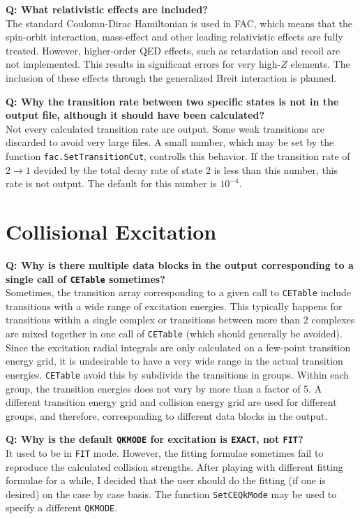 \documentclass[twoside,letterpaper]{refrep}
\newcommand{\key}[1]{\texttt{#1}}
\newcounter{faq}[section]
\newcommand{\faq}[2]{\stepcounter{faq}
	\begin{minipage}{\textwidth}
	\textbf{Q\arabic{faq}: #1?}\\#2
	\end{minipage}}
\begin{document}
\faq{What relativistic effects are included}{
The standard Coulomn-Dirac Hamiltonian is used in FAC, which means that the
spin-orbit interaction, mass-effect and other leading relativistic effects are
fully treated. However, higher-order QED effects, such as retardation and
recoil are not implemented. This results in significant errors for very
high-$Z$ elements. The inclusion of these effects through the generalized
Breit interaction is planned.}

\faq{Why the transition rate between two specific states is not in the output
file, although it should have been calculated}{
Not every calculated transition rate are output. Some weak transitions are
discarded to avoid very large files. A small number, which may be set by the
function \key{fac.SetTransitionCut}, controlls this behavior. If the
transition rate of $2\to 1$ devided by the total decay rate of state 2 is less
than this number, this rate is not output. The default for this number is
$10^{-4}$.}

\section{Collisional Excitation}
\faq{Why is there multiple data blocks in the output corresponding to a single
call of \key{CETable} sometimes}{
Sometimes, the transition array corresponding to a given call to \key{CETable}
include transitions with a wide range of excitation energies. This typically
happens for transitions within a single complex or transitions between more
than 2 complexes are mixed together in one call of \key{CETable} (which should
generally be avoided). Since the excitation radial integrals are only
calculated on a few-point transition energy grid, it is undesirable to have a
very wide range in the actual transition energies. \key{CETable} avoid this by
subdivide the transitions in groups. Within each group, the transition
energies does not vary by more than a factor of 5. A different transition
energy grid and collision energy grid are used for different groups, and
therefore, corresponding to different data blocks in the output.}

\faq{Why is the default \key{QKMODE} for excitation is \key{EXACT}, not
\key{FIT}}{
It used to be in \key{FIT} mode. However, the fitting formulae sometimes fail
to reproduce the calculated collision strengths. After playing with different
fitting formulae for a while, I decided that the user should do the fitting
(if one is desired) on the case by case basis. The function \key{SetCEQkMode}
may be used to specify a different \key{QKMODE}.}
\end{document}
